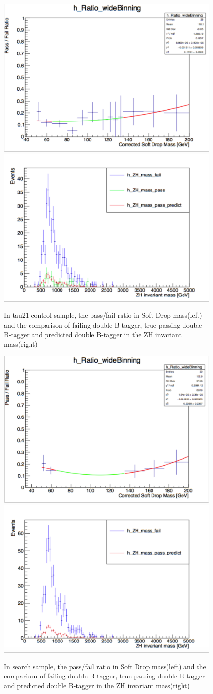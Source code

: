 \documentclass{article}
\begin{document}
\begin{figure}
\centering
\includegraphics[width=.45\textwidth]{figures/tau21Region_PassFailRatio.pdf}\quad
\includegraphics[width=.45\textwidth]{figures/tau21Region_ZHmass.pdf}
\caption{In tau21 control sample, the pass/fail ratio in Soft Drop mass(left) and the comparison of failing double B-tagger, true passing double B-tagger and predicted double B-tagger in the ZH invariant mass(right)}
\label{pics:blablabla}
\end{figure}



\begin{figure}
\centering
\includegraphics[width=.45\textwidth]{figures/SRRegion_PassFailRatio.pdf}\quad
\includegraphics[width=.45\textwidth]{figures/SRRegion_ZHmass.pdf}
\caption{In search sample, the pass/fail ratio in Soft Drop mass(left) and the comparison of failing double B-tagger, true passing double B-tagger and predicted double B-tagger in the ZH invariant mass(right)}
\label{pics:blablabla}
\end{figure}
\end{document}
